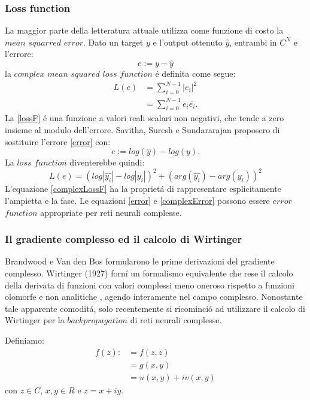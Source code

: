 \documentclass[a4paper,10pt]{article}
\begin{document}
 \subsubsection{Loss function}
 La maggior parte della letteratura attuale utilizza come funzione di costo la $mean$ $squarred$ $error$. Dato un target $y$ e l'output ottenuto $\widehat{y}$, entrambi in $C^N$ e l'errore: 
 \begin{equation}
  e:=y-\widehat{y}\label{error}
 \end{equation}
 la $complex$ $mean$ $squared$ $loss$ $function$ \'e definita come segue:
 \begin{align}
  L(e) &= \sum_{i=0}^{N-1} \left| e_i\right|^2\label{lossF}\\
  &=\sum_{i=0}^{N-1} e_i \overline{e_i}.
 \end{align}
 La \ref{lossF} \'e una funzione a valori reali scalari non negativi, che tende a zero insieme al modulo dell'errore. Savitha, Suresh e Sundararajan proposero di sostituire l'errore \ref{error} con:
 \begin{equation}
  e:=log ( \widehat{y} ) - log ( y ).\label{complexError}
 \end{equation}
 La $loss$ $function$ diventerebbe quindi:
 \begin{equation}
  L(e)=\left( log\left| \widehat{y_i}\right|-log\left| y_i\right|\right)^2 + \left(arg( \widehat{y_i}) - arg  (y_i)\right)^2 \label{complexLossF}
 \end{equation}
 L'equazione \ref{complexLossF} ha la propriet\'a di rappresentare esplicitamente l'ampietta e la fase.
 Le equazioni \ref{error} e \ref{complexError} possono essere $error$ $function$ appropriate per reti neurali complesse.
 
 \subsubsection{Il gradiente complesso ed il calcolo di Wirtinger}
 Brandwood e Van den Bos formularono le prime derivazioni del gradiente complesso. Wirtinger (1927) forn\'i un formalismo equivalente che rese il calcolo della derivata di funzioni con valori complessi meno oneroso rispetto a funzioni olomorfe e non analitiche , agendo interamente nel campo complesso. Nonostante tale apparente comodit\'a, solo recentemente si ricominci\'o ad utilizzare il calcolo di Wirtinger per la $backpropagation$ di reti neurali complesse. 

 Definiamo:
 \begin{align}
  f(z) : &= f\left( z,\overline{z}\right)\\
  &= g\left( x,y\right)\\
  &= u\left( x,y\right) +iv\left( x,y\right)
 \end{align}
 con $z\in C$, $x,y\in R$ e $z=x+iy$. 
\end{document}
